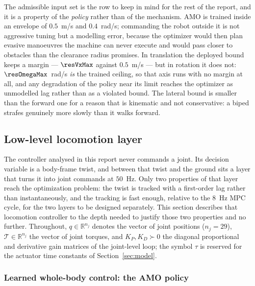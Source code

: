 \documentclass[11pt,a4paper]{article}
\newcommand{\R}{\mathbb{R}}
\begin{document}
The admissible input set is the row to keep in mind for the rest of the report, and it is a property of the
\emph{policy} rather than of the mechanism. AMO is trained inside an envelope of $0.5$~m/s and $0.4$~rad/s;
commanding the robot outside it is not aggressive tuning but a modelling error, because the optimizer would
then plan evasive manoeuvres the machine can never execute and would pass closer to obstacles than the
clearance radius promises. In translation the deployed bound keeps a margin --- $\resVxMax$ against
$0.5$~m/s --- but in rotation it does not: $\resOmegaMax$~rad/s \emph{is} the trained ceiling, so that axis
runs with no margin at all, and any degradation of the policy near its limit reaches the optimizer as
unmodelled lag rather than as a violated bound. The lateral bound is smaller than the forward one for a
reason that is kinematic and not conservative: a biped strafes genuinely more slowly than it walks forward.

\subsection{Low-level locomotion layer}
\label{sec:lowlevel}

The controller analysed in this report never commands a joint. Its decision variable is a body-frame twist,
and between that twist and the ground sits a layer that turns it into joint commands at $50$~Hz. Only two
properties of that layer reach the optimization problem: the twist is tracked with a first-order lag rather
than instantaneously, and the tracking is fast enough, relative to the $8$~Hz MPC cycle, for the two layers
to be designed separately. This section describes that locomotion controller to the depth needed to justify
those two properties and no further. Throughout, $q\in\R^{n_j}$ denotes the vector of joint positions
($n_j=29$), $\mathcal{T}\in\R^{n_j}$ the vector of joint torques, and $K_P,K_D\succ0$ the diagonal
proportional and derivative gain matrices of the joint-level loop; the symbol $\tau$ is reserved for the
actuator time constants of Section~\ref{sec:model}.

\subsubsection{Learned whole-body control: the AMO policy}
\label{sec:g1rl}
\end{document}

